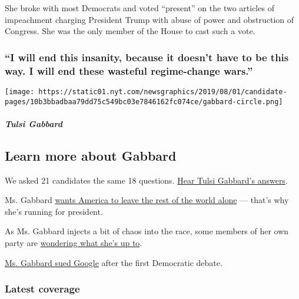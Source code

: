She broke with most Democrats and voted ``present'' on the two articles
of impeachment charging President Trump with abuse of power and
obstruction of Congress. She was the only member of the House to cast
such a vote.

\hypertarget{i-will-end-this-insanity-because-it-doesnt-have-to-be-this-way-i-will-end-these-wasteful-regime-change-wars}{%
\subsubsection{``I will end this insanity, because it doesn't have to be
this way. I will end these wasteful regime-change
wars.''}\label{i-will-end-this-insanity-because-it-doesnt-have-to-be-this-way-i-will-end-these-wasteful-regime-change-wars}}

\texttt{[image: https://static01.nyt.com/newsgraphics/2019/08/01/candidate-pages/10b3bbadbaa79dd75c549bc03e7846162fc074ce/gabbard-circle.png]}

\hypertarget{tulsi-gabbard-1}{%
\subparagraph{Tulsi Gabbard}\label{tulsi-gabbard-1}}

\hypertarget{learn-more-about-gabbard}{%
\subsection{Learn more about Gabbard}\label{learn-more-about-gabbard}}

We asked 21 candidates the same 18 questions.
\href{https://www.nytimes.com/interactive/2019/us/politics/tulsi-gabbard-2020-campaign.html}{Hear
Tulsi Gabbard's answers}.

Ms. Gabbard
\href{https://www.nytimes.com/2019/08/02/us/politics/tulsi-gabbard-2020-presidential-race.html}{wants
America to leave the rest of the world alone} --- that's why she's
running for president.

As Ms. Gabbard injects a bit of chaos into the race, some members of her
own party are
\href{https://www.nytimes.com/2019/10/12/us/politics/tulsi-gabbard.html}{wondering
what she's up to}.

\href{https://www.nytimes.com/2019/07/25/technology/tulsi-gabbard-sues-google.html?module=inline}{Ms.
Gabbard sued Google} after the first Democratic debate.

\hypertarget{latest-coverage}{%
\subsubsection{Latest coverage}\label{latest-coverage}}

